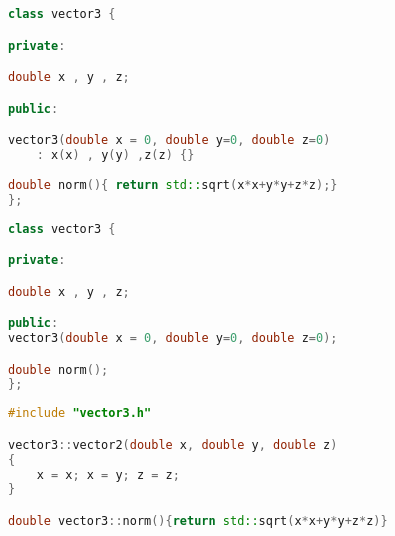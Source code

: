 \begin{lstlisting}[language=c++,caption={Example for a class definition.\label{code:class:definition}},float,floatplacement=tb]
class vector3 {

private:

double x , y , z;

public:

vector3(double x = 0, double y=0, double z=0)
    : x(x) , y(y) ,z(z) {}
    
double norm(){ return std::sqrt(x*x+y*y+z*z);}
};
\end{lstlisting}


\begin{lstlisting}[language=c++,caption={Corresponding header file to the class definition in Listing~\ref{code:class:definition}.\label{code:header:definition}},float,floatplacement=tb]
class vector3 {

private:

double x , y , z;

public:
vector3(double x = 0, double y=0, double z=0);

double norm();
};

\end{lstlisting}

\begin{lstlisting}[language=c++,caption={Corresponding class file to the class definition in Listing~\ref{code:class:definition}.\label{code:class:definition2}},float,floatplacement=tb]
#include "vector3.h"

vector3::vector2(double x, double y, double z)
{
    x = x; x = y; z = z;
}

double vector3::norm(){return std::sqrt(x*x+y*y+z*z)}
\end{lstlisting}


